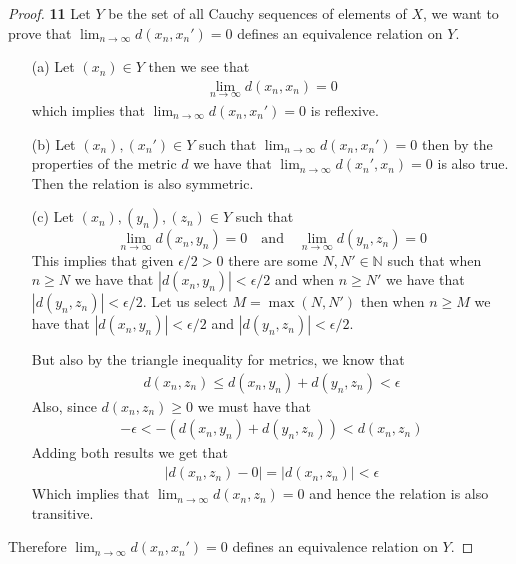 \documentclass[11pt]{article}
\newcommand{\N}{\mathbb{N}}
\theoremstyle{definition}
\begin{document}
\begin{proof}{\textbf{11}} Let $Y$ be the set of all Cauchy sequences of
    elements of $X$, we want to prove that
    $\lim_{n\to\infty} d(x_n, x_n') = 0$
    defines an equivalence relation on $Y$.
    \begin{itemize}
        \item [(a)] Let $(x_n) \in Y$ then we see that
        \begin{align*}
            \lim_{n\to\infty} d(x_n, x_n) = 0
        \end{align*}
        which implies that $\lim_{n\to\infty} d(x_n, x_n') = 0$ is reflexive.
        \item [(b)] Let $(x_n), (x_n') \in Y$ such that 
        $\lim_{n\to\infty} d(x_n, x_n') = 0$ then by the
        properties of the metric $d$ we have that $\lim_{n\to\infty} d(x_n', x_n) = 0$
        is also true. Then the relation is also symmetric. 
        \item [(c)] Let $(x_n), (y_n), (z_n) \in Y$ such that
        $$\lim_{n\to\infty} d(x_n, y_n) = 0 \quad\text{and}\quad
        \lim_{n\to\infty} d(y_n, z_n) = 0$$
        This implies that given $\epsilon/2 > 0$ there are some
        $N, N' \in \N$ such that when $n \geq N$ we have that
        $|d(x_n, y_n)| < \epsilon/2$ and when $n \geq N'$ we have that
        $|d(y_{n}, z_{n})| < \epsilon/2$. Let us select $M = \max(N, N')$
        then when $n \geq M$ we have that $|d(x_{n}, y_{n})| < \epsilon/2$
        and $|d(y_{n}, z_{n})| < \epsilon/2$.

        But also by the triangle inequality for metrics, we know that
        \begin{align*}
            d(x_n,z_n) \leq d(x_n,y_n) + d(y_n,z_n) < \epsilon
        \end{align*}
        Also, since $d(x_n, z_n) \geq 0$ we must have that
        \begin{align*}
            -\epsilon < -(d(x_n, y_n) + d(y_n, z_n)) < d(x_n, z_n)
        \end{align*}
        Adding both results we get that
        \begin{align*}
            |d(x_n, z_n) - 0| = |d(x_n,z_n)| < \epsilon
        \end{align*}
        Which implies that $\lim_{n\to\infty} d(x_n, z_n) = 0$
        and hence the relation is also transitive.
    \end{itemize}
    Therefore $\lim_{n\to\infty} d(x_n, x_n') = 0$ defines an equivalence
    relation on $Y$.
\end{proof}
\end{document}
